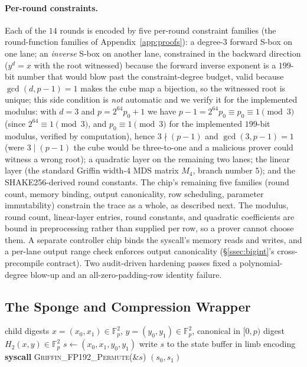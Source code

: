 \paragraph{Per-round constraints.}
Each of the $14$ rounds is encoded by five per-round constraint families (the round-function families of Appendix~\ref{app:proofs}): a degree-$3$ forward S-box on one lane; an \emph{inverse} S-box on another lane, constrained in the backward direction ($y^d = x$ with the root witnessed) because the forward inverse exponent is a $199$-bit number that would blow past the constraint-degree budget, valid because $\gcd(d,p-1)=1$ makes the cube map a bijection, so the witnessed root is unique; this side condition is \emph{not} automatic and we verify it for the implemented modulus: with $d=3$ and $p = 2^{64}p_0+1$ we have $p-1 = 2^{64}p_0\equiv p_0\equiv 1\pmod 3$ (since $2^{64}\equiv 1\pmod 3$, and $p_0\equiv 1\pmod 3$ for the implemented $199$-bit modulus, verified by computation), hence $3\nmid(p-1)$ and $\gcd(3,p-1)=1$ (were $3\mid(p-1)$ the cube would be three-to-one and a malicious prover could witness a wrong root); a quadratic layer on the remaining two lanes; the linear layer (the standard Griffin width-$4$ MDS matrix $M_4$, branch number $5$); and the SHAKE256-derived round constants. The chip's remaining five families (round count, memory binding, output canonicality, row scheduling, parameter immutability) constrain the trace as a whole, as described next. The modulus, round count, linear-layer entries, round constants, and quadratic coefficients are bound in preprocessing rather than supplied per row, so a prover cannot choose them. A separate controller chip binds the syscall's memory reads and writes, and a per-lane output range check enforces output canonicality (\S\ref{ssec:bigint}'s cross-precompile contract). Two audit-driven hardening passes fixed a polynomial-degree blow-up and an all-zero-padding-row identity failure.

\subsection{The Sponge and Compression Wrapper}\label{ssec:sponge}
\begin{algorithm}[H]
\caption{Guest-side 2-to-1 compression $H_2$ via the
  \textsc{Griffin\_FP192\_Permute} syscall}
\label{alg:guest-h2}
\begin{algorithmic}[1]
\Require child digests $x=(x_0,x_1)\in\mathbb{F}_p^2$,
         $y=(y_0,y_1)\in\mathbb{F}_p^2$, canonical in $[0,p)$
\Ensure  digest $H_2(x,y)\in\mathbb{F}_p^2$
\State $s \gets (x_0, x_1, y_0, y_1)$
\State write $s$ to the state buffer in limb encoding
\State \textbf{syscall} \textsc{Griffin\_FP192\_Permute}(\&$s$)
\State \Return $(s_0, s_1)$
\end{algorithmic}
\end{algorithm}

